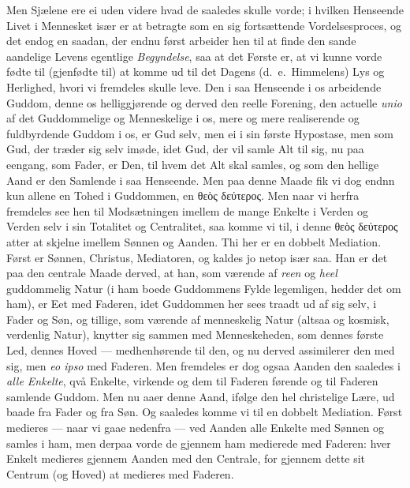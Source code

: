 \documentclass[12pt,a4paper]{book}
\newcommand{\apage}[1]{\marginnote{\footnotesize\textit{[#1]}}}
\begin{document}
Men Sjælene ere ei uden videre hvad de saaledes skulle vorde; \apage{146} i hvilken Henseende
Livet i Mennesket især er at betragte som en sig fortsættende Vordelsesproces, og
det endog en saadan, der endnu først arbeider hen til at finde den sande aandelige
Levens egentlige \emph{Begyndelse}, saa at det Første er, at vi kunne vorde fødte til
(gjenfødte til) at komme ud til det Dagens (d.\ e.\ Himmelens) Lys og Herlighed,
hvori vi fremdeles skulle leve. Den i saa Henseende i os arbeidende Guddom, denne
os helliggjørende og derved den reelle Forening, den actuelle \textit{unio} af
det Guddommelige og Menneskelige i os, mere og mere realiserende og fuldbyrdende
Guddom i os, er Gud selv, men ei i sin første Hypostase, men som Gud, der træder
sig selv imøde, idet Gud, der vil samle Alt til sig, nu paa eengang, som Fader, er
Den, til hvem det Alt skal samles, og som den hellige Aand er den Samlende i saa
Henseende. Men paa denne Maade fik vi dog endnn kun allene en Tohed i Guddommen,
en θεὸς δεύτερος. Men naar vi herfra fremdeles see hen til Modsætningen imellem de
mange Enkelte i Verden og Verden selv i sin Totalitet og Centralitet, saa komme vi
til, i denne θεὸς δεύτερος atter at skjelne imellem Sønnen og Aanden. Thi her er
en dobbelt Mediation. Først er Sønnen, Christus, Mediatoren, og kaldes jo netop
især saa. Han er det paa den centrale Maade derved, at han, som værende af \emph{reen} og
\emph{heel} guddommelig Natur (i ham boede Guddommens Fylde legemligen, hedder det om
ham), er Eet med Faderen, idet Guddommen her sees traadt ud af sig selv, i Fader
og Søn, og tillige, som værende af menneskelig Natur (altsaa og kosmisk, verdenlig
Natur), knytter sig sammen med Menneskeheden, som dennes første Led, dennes Hoved
--- medhenhørende til den, og nu derved assimilerer den med sig, men \textit{eo
ipso} med Faderen. Men fremdeles er dog ogsaa Aanden den saaledes i \emph{alle Enkelte},
qvå Enkelte, virkende og dem til Faderen førende og til Faderen samlende Guddom.
Men nu aaer denne Aand, ifølge den hel christelige Lære, ud baade fra
\apage{147} Fader og fra Søn. Og saaledes komme vi til en dobbelt Mediation. Først medieres
--- naar vi gaae nedenfra --- ved Aanden alle Enkelte med Sønnen og samles i ham,
men derpaa vorde de gjennem ham medierede med Faderen: hver Enkelt medieres
gjennem Aanden med den Centrale, for gjennem dette sit Centrum (og Hoved) at
medieres med Faderen.
\end{document}
